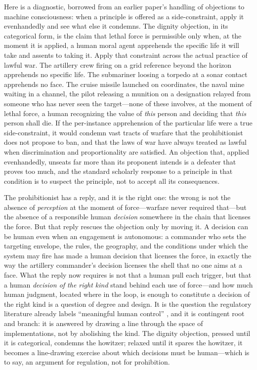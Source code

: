 \documentclass[11pt]{article}
\begin{document}
Here is a diagnostic, borrowed from an earlier paper's handling of objections to machine consciousness: when a principle is offered as a side-constraint, apply it evenhandedly and see what else it condemns. The dignity objection, in its categorical form, is the claim that lethal force is permissible only when, at the moment it is applied, a human moral agent apprehends the specific life it will take and assents to taking it. Apply that constraint across the actual practice of lawful war. The artillery crew firing on a grid reference beyond the horizon apprehends no specific life. The submariner loosing a torpedo at a sonar contact apprehends no face. The cruise missile launched on coordinates, the naval mine waiting in a channel, the pilot releasing a munition on a designation relayed from someone who has never seen the target---none of these involves, at the moment of lethal force, a human recognizing the value of \emph{this} person and deciding that \emph{this} person shall die. If the per-instance apprehension of the particular life were a true side-constraint, it would condemn vast tracts of warfare that the prohibitionist does not propose to ban, and that the laws of war have always treated as lawful when discrimination and proportionality are satisfied. An objection that, applied evenhandedly, unseats far more than its proponent intends is a defeater that proves too much, and the standard scholarly response to a principle in that condition is to suspect the principle, not to accept all its consequences.

The prohibitionist has a reply, and it is the right one: the wrong is not the absence of \emph{perception} at the moment of force---warfare never required that---but the absence of a responsible human \emph{decision} somewhere in the chain that licenses the force. But that reply rescues the objection only by moving it. A decision can be human even when an engagement is autonomous: a commander who sets the targeting envelope, the rules, the geography, and the conditions under which the system may fire has made a human decision that licenses the force, in exactly the way the artillery commander's decision licenses the shell that no one aims at a face. What the reply now requires is not that a human pull each trigger, but that a human \emph{decision of the right kind} stand behind each use of force---and how much human judgment, located where in the loop, is enough to constitute a decision of the right kind is a question of degree and design. It is the question the regulatory literature already labels ``meaningful human control'' \citep{roff2016}, and it is contingent root and branch: it is answered by drawing a line through the space of implementations, not by abolishing the kind. The dignity objection, pressed until it is categorical, condemns the howitzer; relaxed until it spares the howitzer, it becomes a line-drawing exercise about which decisions must be human---which is to say, an argument for regulation, not for prohibition.
\end{document}
